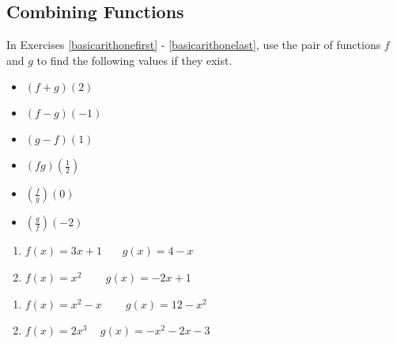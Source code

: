 \subsection{Combining Functions}

In Exercises \ref{basicarithonefirst} - \ref{basicarithonelast}, use the pair of functions $f$ and $g$ to find the following values if they exist.

\begin{multicols}{3}
\begin{itemize}

\item  $(f+g)(2)$ 
\item  $(f-g)(-1)$
\item  $(g-f)(1)$

\end{itemize}
\end{multicols}

\begin{multicols}{3}
\begin{itemize}

\item  $(fg)\left(\frac{1}{2}\right)$
\item  $\left(\frac{f}{g}\right)(0)$
\item  $\left(\frac{g}{f}\right)\left(-2\right)$

\end{itemize}
\end{multicols}

\begin{multicols}{2}
\begin{enumerate}

\item  $f(x) = 3x+1$~~~  $g(x) = 4-x$ \label{basicarithonefirst}
\item  $f(x) = x^2$ ~~~ $g(x) = -2x+1$

\setcounter{HW}{\value{enumi}}
\end{enumerate}
\end{multicols}

\begin{multicols}{2}
\begin{enumerate}
\setcounter{enumi}{\value{HW}}

\item  $f(x) = x^2 - x$ ~~~  $g(x) = 12-x^2$
\item  $f(x) = 2x^3$ ~ \mbox{$g(x) = -x^2-2x-3$}

\setcounter{HW}{\value{enumi}}
\end{enumerate}
\end{multicols}

